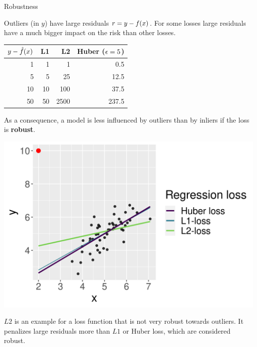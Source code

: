 
\begin{vbframe}{Robustness}

\small

Outliers (in $y$) have large residuals $r = y - f(x)$. For some losses large residuals have a much bigger impact on the risk than other losses. 

\vspace{0.5cm}

\begin{minipage}[c]{0.55\textwidth}
  \footnotesize
  \begin{table}[]
  \begin{tabular}{r|r|r|r}
  \toprule
  $y - \hat{f}(x)$ & L1 & L2 & Huber ($\epsilon = 5$) \\ \hline
  1 & 1 & 1 & 0.5 \\
  5 & 5 & 25 & 12.5 \\
  10 & 10 & 100 & 37.5 \\
  50 & 50 & 2500  & 237.5
\end{tabular}
\end{table}
\end{minipage}%
\begin{minipage}[c]{0.05\textwidth}
  \phantom{foo}
\end{minipage}%
\begin{minipage}[c]{0.4\textwidth}
  \small
  As a consequence, a model is less influenced by outliers than by inliers if 
  the loss is \textbf{robust}.
\end{minipage}%

\vfill

\begin{minipage}[c]{0.55\textwidth}
  \includegraphics[width=\textwidth]{figure/robustness}
  \footnotesize \centering
\end{minipage}%
\begin{minipage}[c]{0.05\textwidth}
  \phantom{foo}
\end{minipage}%
\begin{minipage}[c]{0.4\textwidth}
  \small \raggedright
  $L2$ is an example for a loss function that is not very robust towards
  outliers. It penalizes large residuals more than $L1$ or Huber loss, which are
  considered robust.
\end{minipage}%


\end{vbframe}
